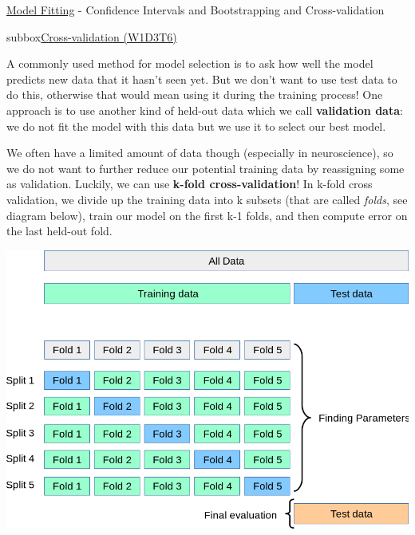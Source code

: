 \begin{textbox}{\href{https://compneuro.neuromatch.io/tutorials/W1D3_ModelFitting/student/W1D3_Tutorial2.html}{Model Fitting} -  Confidence Intervals and Bootstrapping and Cross-validation}
\begin{subbox}{subbox}{\href{https://compneuro.neuromatch.io/tutorials/W1D3_ModelFitting/student/W1D3_Tutorial6.html}{Cross-validation (W1D3T6)}  }
\scriptsize

A commonly used method for model selection is to ask how well the model predicts new data that it hasn't seen yet. But we don't want to use test data to do this, otherwise that would mean using it during the training process! One approach is to use another kind of held-out data which we call \textbf{validation data}: we do not fit the model with this data but we use it to select our best model.

We often have a limited amount of data though (especially in neuroscience), so we do not want to further reduce our potential training data by reassigning some as validation. Luckily, we can use \textbf{k-fold cross-validation}! In k-fold cross validation, we divide up the training data into k subsets (that are called \textit{folds}, see diagram below), train our model on the first k-1 folds, and then compute error on the last held-out fold.

\centering
\includegraphics[scale=0.14]{Figures/ModelFitting/MFFigure7.png}

\end{subbox}
\end{textbox}
